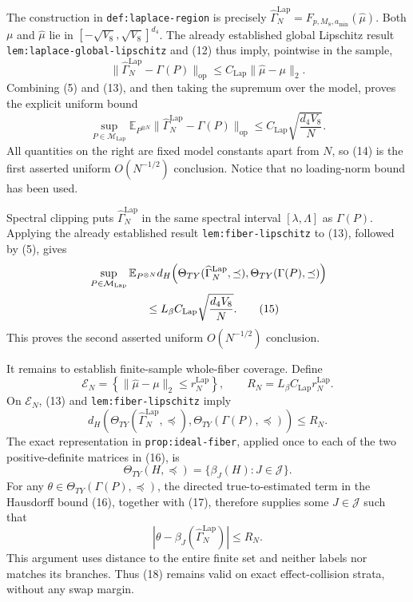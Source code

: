 The construction in \texttt{def:laplace-region} is precisely
\(\widehat\Gamma_N^{\mathrm{Lap}}
=F_{p,M_8,a_{\min}}(\widehat\mu)\).  Both \(\mu\) and
\(\widehat\mu\) lie in
\([-\sqrt{V_8},\sqrt{V_8}]^{d_4}\).  The already established global
Lipschitz result \texttt{lem:laplace-global-lipschitz} and (12) thus imply,
pointwise in the sample,
\[
 \lVert\widehat\Gamma_N^{\mathrm{Lap}}-\Gamma(P)\rVert_{\mathrm{op}}
 \leq C_{\mathrm{Lap}}\lVert\widehat\mu-\mu\rVert_2.   \tag{13}
\]
Combining (5) and (13), and then taking the supremum over the model, proves
the explicit uniform bound
\[
 \sup_{P\in\mathcal M_{\mathrm{Lap}}}
 \mathbb E_{P^{\otimes N}}
 \lVert\widehat\Gamma_N^{\mathrm{Lap}}-\Gamma(P)\rVert_{\mathrm{op}}
 \leq C_{\mathrm{Lap}}\sqrt{\frac{d_4V_8}{N}}.          \tag{14}
\]
All quantities on the right are fixed model constants apart from \(N\), so
(14) is the first asserted uniform \(O(N^{-1/2})\) conclusion.  Notice that
no loading-norm bound has been used.

Spectral clipping puts \(\widehat\Gamma_N^{\mathrm{Lap}}\) in the same
spectral interval \([\lambda,\Lambda]\) as \(\Gamma(P)\).  Applying the
already established result \texttt{lem:fiber-lipschitz} to (13), followed by
(5), gives
\[
 \begin{aligned}
 &\sup_{P\in\mathcal M_{\mathrm{Lap}}}
 \mathbb E_{P^{\otimes N}}
 d_H\!\left(
 \Theta_{TY}(\widehat\Gamma_N^{\mathrm{Lap}},\preceq),
 \Theta_{TY}(\Gamma(P),\preceq)
 \right)\\
 &\hspace{18mm}\leq
 L_\beta C_{\mathrm{Lap}}\sqrt{\frac{d_4V_8}{N}}.
                                                               \tag{15}
 \end{aligned}
\]
This proves the second asserted uniform \(O(N^{-1/2})\) conclusion.

It remains to establish finite-sample whole-fiber coverage.  Define
\[
 \mathcal E_N=
 \left\{\lVert\widehat\mu-\mu\rVert_2
 \leq r_N^{\mathrm{Lap}}\right\},
 \qquad
 R_N=L_\beta C_{\mathrm{Lap}}r_N^{\mathrm{Lap}}.
\]
On \(\mathcal E_N\), (13) and \texttt{lem:fiber-lipschitz} imply
\[
 d_H\!\left(
 \Theta_{TY}(\widehat\Gamma_N^{\mathrm{Lap}},\preceq),
 \Theta_{TY}(\Gamma(P),\preceq)
 \right)\leq R_N.                                      \tag{16}
\]
The exact representation in \texttt{prop:ideal-fiber}, applied once to each
of the two positive-definite matrices in (16), is
\[
 \Theta_{TY}(H,\preceq)=\{\beta_J(H):J\in\mathcal J\}. \tag{17}
\]
For any \(\theta\in\Theta_{TY}(\Gamma(P),\preceq)\), the directed
true-to-estimated term in the Hausdorff bound (16), together with (17),
therefore supplies some \(J\in\mathcal J\) such that
\[
 \left\lvert
 \theta-\beta_J(\widehat\Gamma_N^{\mathrm{Lap}})
 \right\rvert\leq R_N.                                 \tag{18}
\]
This argument uses distance to the entire finite set and neither labels nor
matches its branches.  Thus (18) remains valid on exact effect-collision
strata, without any swap margin.

